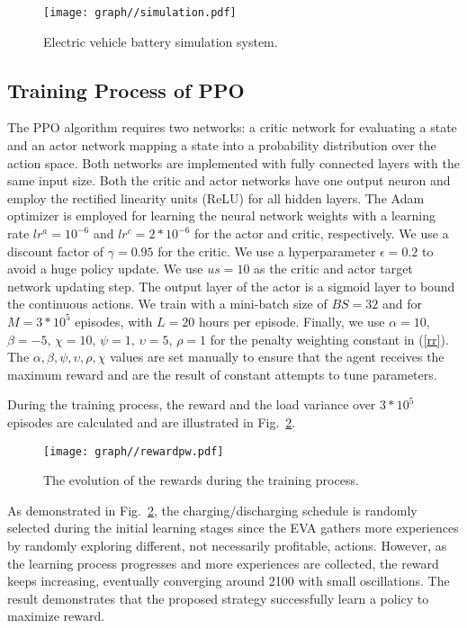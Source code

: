 \documentclass[journal,twoside]{IEEEtran}
\begin{document}
\begin{figure}[h]
    \centering
    \texttt{[image: graph//simulation.pdf]}
    \caption{Electric vehicle battery simulation system.}
    \label{fig:simu}
\end{figure}


\subsection{Training Process of PPO}
The PPO algorithm requires two networks: a critic network for evaluating a state and an actor network mapping a state into a probability distribution over the action space. Both networks are implemented with fully connected layers with the same input size. Both the critic and actor networks have one output neuron and employ the rectified linearity units (ReLU) for all hidden layers. The Adam optimizer is employed for learning the neural network weights with a learning rate $lr^a=10^{-6}$ and $lr^c=2*10^{-6}$ for the actor and critic, respectively. We use a discount factor of $\gamma = 0.95 $ for the critic. We use a hyperparameter $\epsilon=0.2$ to avoid a huge policy update. We use $us = 10 $ as the critic and actor target network updating step. The output layer of the actor is a sigmoid layer to bound the continuous actions. We train with a mini-batch size of $BS=32$ and for $M=3*10^{5}$ episodes, with $L=20$ hours per episode. Finally, we use $\alpha=10$, $\beta={-5}$, $\chi=10$, $\psi=1$, $\upsilon=5$, $\rho=1$ for the penalty weighting constant in (\ref{rr}). The $\alpha, \beta, \psi, \upsilon, \rho, \chi$ values are set manually to ensure that the agent receives the maximum reward and are the result of constant attempts to tune parameters.

During the training process, the reward and the load variance over $3*10^{5}$ episodes are calculated and are illustrated in Fig.~\ref{fig:train}.

\begin{figure}[h]
\centering
\texttt{[image: graph//rewardpw.pdf]}
\caption{The evolution of the rewards during the training process.}
\label{fig:train}
\end{figure}

As demonstrated in Fig.~\ref{fig:train}, the charging/discharging schedule is randomly selected during the initial learning stages since the EVA gathers more experiences by randomly exploring different, not necessarily profitable, actions. However, as the learning process progresses and more experiences are collected, the reward keeps increasing, eventually converging around 2100 with small oscillations. The result demonstrates that the proposed strategy successfully learn a policy to maximize reward.
\end{document}
